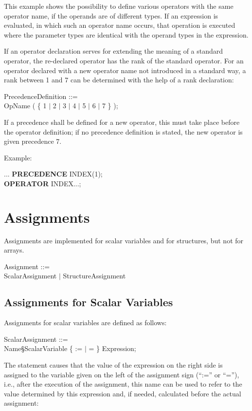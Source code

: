 \begin{removed}
This example shows the possibility to define various operators with the
same operator name, if the operands are of different types. If an
expression is evaluated, in which such an operator name occurs, that
operation is executed where the parameter types are identical with the
operand types in the expression.

If an operator declaration serves for extending the meaning of a
standard operator, the re-declared operator has the rank of the standard
operator. For an operator declared with a new operator name not
introduced in a standard way, a rank between 1 and 7 can be determined
with the help of a rank declaration:

PrecedenceDefinition ::=\\
 OpName ( \{ 1 $\mid$ 2 $\mid$ 3 $\mid$ 4 $\mid$ 5 $\mid$ 6 $\mid$ 7 \} );

If a precedence shall be defined for a new operator, this must take place
before the operator definition; if no precedence definition is stated, the
new operator is given precedence 7.

Example:

...
{\bf PRECEDENCE} INDEX(1);\\
{\bf OPERATOR} INDEX...;
\end{removed}


\section{Assignments}   %

Assignments are implemented for scalar variables and for structures, but
not for arrays.

Assignment ::=\\
\x ScalarAssignment $\mid$ StructureAssignment

\subsection{Assignments for Scalar Variables}   %

Assignments for scalar variables are defined as follows:

ScalarAssignment ::=\\
\x Name\S ScalarVariable \{ := $\mid$ = \} Expression;

The statement causes that the value of the expression on the right side
is assigned to the variable given on the left of the assignment sign
(``:='' or ``=''), i.e., after the execution of the assignment, this
name can be used to refer to the value determined by this expression
and, if needed, calculated before the actual assignment:

